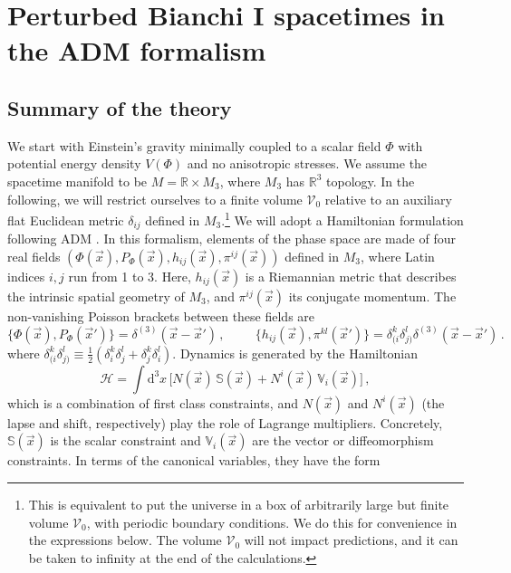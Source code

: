\documentclass[11pt,tightenlines,eqsecnum,floats,aps,amsmath,amssymb,nofootinbib,prd,floatfix]{revtex4}
\def\d{\textrm{d}}
\newcommand{\be}{\nopagebreak[3]\begin{equation}}
\newcommand{\ee}{\end{equation}}
\newcommand{\<}{\langle}
\renewcommand{\>}{\rangle}
\begin{document}

\section{Perturbed Bianchi I spacetimes in the 
ADM formalism}\label{sec:background}

\subsection{Summary of the theory}

We start with Einstein's gravity minimally coupled to a scalar field $\Phi$ with potential energy density $V(\Phi)$ and no anisotropic stresses. We assume  the spacetime manifold to be $M=\mathbb{R} \times M_3$, where $M_3$ has $\mathbb{R}^3$  topology. In the following, we will restrict ourselves to a finite volume $\mathcal{V}_0$ relative to an auxiliary flat Euclidean metric $\delta_{ij}$ defined in $M_3$.\footnote{This is equivalent to put the universe in a box of arbitrarily large but finite volume $\mathcal{V}_0$, with periodic boundary conditions. We do this for convenience in the expressions below. The volume $\mathcal{V}_0$ will not impact  predictions, and it can be taken to infinity at the end of the calculations.} %
We will adopt a Hamiltonian formulation following ADM \cite{Arnowitt:1962hi}. In this formalism, elements of the phase space are made of four real fields $(\Phi(\vec{x}),P_{\Phi}(\vec{x}),h_{ij}(\vec{x}),\pi^{ij}(\vec{x}))$ defined in $M_3$, where Latin indices $i,j$ run from 1 to 3. Here, $h_{ij}(\vec{x})$ is a Riemannian metric that describes the intrinsic spatial geometry of $M_3$, and $\pi^{ij}(\vec{x})$ its conjugate momentum. The non-vanishing Poisson brackets between these fields are
\be \label{PB} \{ \Phi(\vec{x}),P_{\Phi}(\vec{x}')\}=\delta^{(3)}(\vec{x}-\vec{x}')\, ,\hspace{1cm}
\{ h_{ij}(\vec{x}),\pi^{k l}(\vec{x}')\}=\delta_{(i}^k\delta_{j)}^{l}\delta^{(3)}(\vec{x}-\vec{x}')\, .\ee
%
where $\delta_{(i}^k\delta_{j)}^{l}\equiv \frac{1}{2} (\delta_{i}^k\delta_{j}^{l}+\delta_{j}^k\delta_{i}^{l})$. Dynamics is generated by the Hamiltonian 
\be \label{ham} \mathcal H=\int \d^3x \, \Big[N(\vec{x}) \,  \mathbb S (\vec{x})+N^i(\vec{x}) \, \mathbb V_i (\vec{x})\Big]\, ,\ee
which is a combination of first class constraints, and $N(\vec{x})$ and $N^i(\vec{x})$ (the lapse and shift, respectively) play the role of Lagrange multipliers. Concretely, $\mathbb S (\vec{x})$ is the scalar constraint and $ \mathbb V_i (\vec{x})$ are the vector or diffeomorphism constraints. In terms of the canonical variables, they have the form
\end{document}
